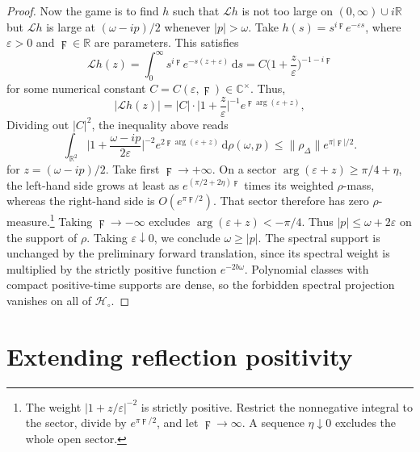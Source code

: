 \documentclass[11pt, letterpaper, reqno]{amsart}
\theoremstyle{definition}
\theoremstyle{remark}
\newcommand{\bbC}{\mathbb{C}}
\newcommand{\bbR}{\mathbb{R}}
\newcommand{\calH}{\mathcal{H}}
\newcommand{\calL}{\mathcal{L}}
\newcommand{\dd}{\,\mathrm{d}}
\begin{document}
\begin{proof}
    Now the game is to find $h$ such that $\calL h$ is not too large on $(0,\infty)\cup i\bbR$ but $\calL h$ is large at $(\omega-ip)/2$ whenever $|p|>\omega$. Take $h(s) =  s^{i \digamma } e^{-\varepsilon s}$, where $\varepsilon>0$ and $\digamma\in\bbR$ are parameters. This satisfies 
    \begin{equation}
        \calL h (z) = \int_0^\infty s^{i\digamma} e^{-s(z+\varepsilon)} \dd s = C \Big(1+\frac{z}{\varepsilon} \Big)^{-1-i\digamma}
    \end{equation}
    for some numerical constant $C=C(\varepsilon,\digamma)\in \bbC^\times$. 
    Thus, 
    \begin{equation}
        |\calL h(z)| =|C| \cdot \Big| 1+\frac{z}{\varepsilon} \Big|^{-1} e^{\digamma \operatorname{arg} (\varepsilon +z)}  ,
    \end{equation}
    Dividing out $|C|^2$, the inequality above reads
    \begin{equation}
        \int_{\bbR^2} \Big| 1 + \frac{\omega-ip}{2\varepsilon} \Big|^{-2} e^{2\digamma \operatorname{arg}(\varepsilon+z)} \dd \rho (\omega,p) \leq \lVert \rho_\Delta \rVert e^{\pi |\digamma|/2}.
    \end{equation}
    for $z=(\omega-ip)/2$. Take first $\digamma\to+\infty$. On a sector
$\operatorname{arg}(\varepsilon+z)\geq\pi/4+\eta$, the left-hand
side grows at least as $e^{(\pi/2+2\eta)\digamma}$ times its
weighted $\rho$-mass, whereas the right-hand side is
$O(e^{\pi\digamma/2})$. That sector therefore has zero
$\rho$-measure.\footnote{The weight $|1+z/\varepsilon|^{-2}$ is
strictly positive. Restrict the nonnegative integral to the sector,
divide by $e^{\pi\digamma/2}$, and let $\digamma\to\infty$.
A sequence $\eta\downarrow0$ excludes the whole open sector.}
Taking $\digamma\to-\infty$ excludes
$\operatorname{arg}(\varepsilon+z)<-\pi/4$. Thus
$|p|\leq\omega+2\varepsilon$ on the support of $\rho$.
Taking $\varepsilon\downarrow0$, we conclude $\omega\geq|p|$.
The spectral support is unchanged by the preliminary forward
translation, since its spectral weight is multiplied by the strictly
positive function $e^{-2b\omega}$. Polynomial classes with compact
positive-time supports are dense, so the forbidden spectral
projection vanishes on all of $\calH_\circ$.
\end{proof}


\section{Extending reflection positivity}\label{sec:extend-RP}
\enlargethispage{2pt}
\end{document}
